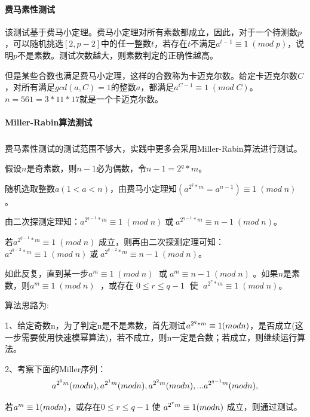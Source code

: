 \documentclass[UTF8,a4paper,11pt]{ctexart}
\newcommand{\upcite}[1]{\textsuperscript{\textsuperscript{\cite{#1}}}}
\begin{document}
\paragraph{费马素性测试}
	\indent \;
	\par 该测试基于费马小定理。费马小定理对所有素数都成立，因此，对于一个待测数$p$，可以随机挑选$[2,p-2]$中的任一整数$t$，若存在$t$不满足$a^{t-1}\equiv 1 \;(mod \; p)$，说明$p$不是素数。测试次数越大，则素数判定的正确性越高。

	\par 但是某些合数也满足费马小定理，这样的合数称为卡迈克尔数。给定卡迈克尔数$C$，对所有满足$gcd(a,C)=1$的整数$a$，都满足$a^{C-1}\equiv 1\; (mod\; C)$。$n=561=3*11*17$就是一个卡迈克尔数。

\paragraph{Miller-Rabin算法测试}
	\indent \;
	\par 费马素性测试的测试范围不够大，实践中更多会采用Miller-Rabin算法进行测试\upcite{4}。
	\par 假设$n$是奇素数，则$n-1$必为偶数，令$n-1=2^q*m$。
	\par 随机选取整数$a(1<a<n)$，由费马小定理知$(a^{2^{q}*m}=a^{n-1})\equiv1\; (mod \; n)$ 。
	\par 由二次探测定理知：$a^{2^{q-1}*m}\equiv 1\; (mod\; n)\;$或$\; a^{2^{q-1}*m}\equiv n-1\; (mod\; n)$。
	\par 若$a^{2^{q-1}*m}\equiv 1\; (mod\; n)$ 成立，则再由二次探测定理可知：$a^{2^{q-2}*m}\equiv 1\; (mod\; n)\;$或$\; a^{2^{q-2}*m}\equiv n-1\; (mod\; n)$。
	\par 如此反复，直到某一步$a^{m}\equiv 1\; (mod \; n)\;$ 或$\; a^{m}\equiv n-1\; (mod \; n)$ 。如果$n$是素数，则$a^m\equiv 1\; (mod \; n)\;$ ，或存在$\; 0\leq r\leq q-1 \;$ 使 $\; a^{2^{r}*m}\equiv 1\; (mod\; n)$。 \\
	\indent \;
	\par 算法思路为:
	\par 1、给定奇数n，为了判定n是不是素数，首先测试$a^{2^{q}*m}\equiv1\space (mod \space n)$，是否成立(这一步需要使用快速模幂算法)，若不成立，则n一定是合数；若成立，则继续运行算法。
	\par 2、考察下面的Miller序列：
	$$
		a^{2^{0}m}(mod\space n),a^{2^{1}m}(mod\space n),a^{2^{2}m}(mod\space n),...a^{2^{q-1}m}(mod\space n),
	$$
	\par 若$a^{m}\equiv 1\space(mod \space n)$，或存在$0\leq r\leq q-1$ 使 $a^{2^{r}m}\equiv 1\space (mod\space n)$ 成立，则通过测试。 \\
	
\end{document}
